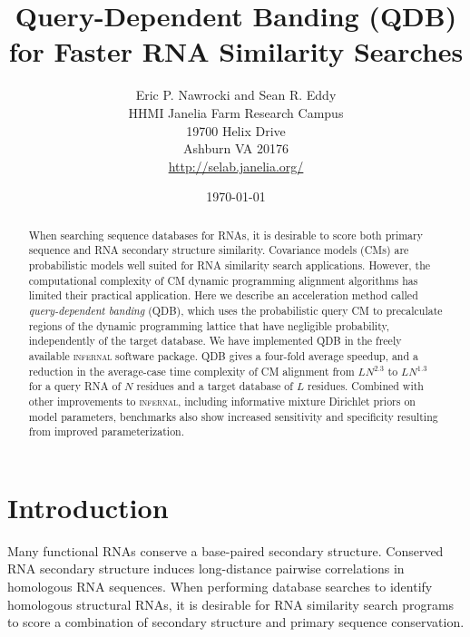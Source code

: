 \documentclass[11pt]{article}
\begin{document}
\title{Query-Dependent Banding (QDB) for Faster RNA Similarity Searches}
\author{Eric P. Nawrocki and Sean R. Eddy\\
HHMI Janelia Farm Research Campus\\
19700 Helix Drive\\
Ashburn VA 20176\\
\url{http://selab.janelia.org/}\\
}
\date{\today}
\maketitle




\begin{abstract}

When searching sequence databases for RNAs, it is desirable to score
both primary sequence and RNA secondary structure similarity.
Covariance models (CMs) are probabilistic models well suited for RNA
similarity search applications. However, the computational complexity
of CM dynamic programming alignment algorithms has limited their
practical application. Here we describe an acceleration method called
\emph{query-dependent banding} (QDB), which uses the probabilistic
query CM to precalculate regions of the dynamic programming lattice
that have negligible probability, independently of the target database. We
have implemented QDB in the freely available \textsc{infernal}
software package.  QDB gives a four-fold average speedup,
and a reduction in the average-case time complexity of CM alignment
from $LN^{2.3}$ to $LN^{1.3}$ for a query RNA of $N$ residues and a
target database of $L$ residues. Combined with other improvements to
\textsc{infernal}, including informative mixture Dirichlet priors on
model parameters, benchmarks also show increased sensitivity and
specificity resulting from improved parameterization.

\end{abstract}



\section{Introduction}

Many functional RNAs conserve a base-paired secondary structure.
Conserved RNA secondary structure induces long-distance pairwise
correlations in homologous RNA sequences.  When performing database
searches to identify homologous structural RNAs, it is desirable for
RNA similarity search programs to score a combination of secondary
structure and primary sequence conservation.
\end{document}
